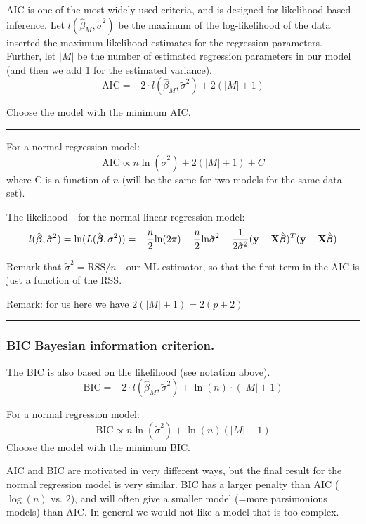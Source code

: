 \documentclass[]{article}
\begin{document}
AIC is one of the most widely used criteria, and is designed for
likelihood-based inference. Let \(l(\hat{\beta}_M,\tilde{\sigma}^2)\) be
the maximum of the log-likelihood of the data inserted the maximum
likelihood estimates for the regression parameters. Further, let
\(\lvert M \rvert\) be the number of estimated regression parameters in
our model (and then we add 1 for the estimated variance).
\[\text{AIC} =-2 \cdot l(\hat{\beta}_M,\tilde{\sigma}^2)+2(\lvert M\rvert +1)\]

Choose the model with the minimum AIC.

\begin{center}\rule{0.5\linewidth}{\linethickness}\end{center}

For a normal regression model:
\[\text{AIC} \propto n\ln(\tilde{\sigma}^2)+2(\lvert M\rvert +1)+C\]
where C is a function of \(n\) (will be the same for two models for the
same data set).

The likelihood - for the normal linear regression model:
\[l(\hat{\boldsymbol\beta},{\tilde{\sigma}^2})=\text{ln}(L(\hat{\boldsymbol\beta},{\sigma^2}))=-\frac{n}{2}\text{ln}(2\pi)-\frac{n}{2}\text{ln}\tilde{\sigma}^2-\frac{1}{2\tilde{\sigma}^2} ({\bf y}-{\bf X}\hat{\boldsymbol\beta})^T({\bf y}-
{\bf X}\hat{\boldsymbol\beta})\]

Remark that \(\tilde{\sigma}^2=\text{RSS}/n\) - our ML estimator, so
that the first term in the AIC is just a function of the RSS.

Remark: for us here we have \(2(\lvert M\rvert +1)=2(p+2)\)

\begin{center}\rule{0.5\linewidth}{\linethickness}\end{center}

\hypertarget{bic-bayesian-information-criterion.}{%
\subsubsection{BIC Bayesian information
criterion.}\label{bic-bayesian-information-criterion.}}

The BIC is also based on the likelihood (see notation above).
\[\text{BIC} =-2 \cdot l(\hat{\beta}_M,\tilde{\sigma}^2)+\ln(n)\cdot (\lvert M\rvert +1)\]

For a normal regression model:
\[ \text{BIC} \propto n\ln(\tilde{\sigma}^2)+\ln(n)(\lvert M\rvert +1)\]
Choose the model with the minimum BIC.

AIC and BIC are motivated in very different ways, but the final result
for the normal regression model is very similar. BIC has a larger
penalty than AIC (\(\log(n)\) vs. \(2\)), and will often give a smaller
model (=more parsimonious models) than AIC. In general we would not like
a model that is too complex.
\end{document}
